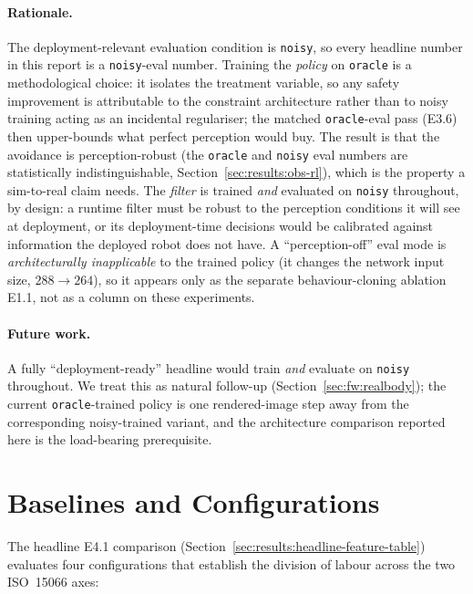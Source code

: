 \documentclass[11pt,a4paper]{report}
\newcommand{\iso}{ISO~15066}
\begin{document}
\paragraph{Rationale.}
The deployment-relevant evaluation condition is \texttt{noisy}, so
every headline number in this report is a \texttt{noisy}-eval number.
Training the \emph{policy} on \texttt{oracle} is a methodological
choice: it isolates the treatment variable, so any safety improvement
is attributable to the constraint architecture rather than to noisy
training acting as an incidental regulariser; the matched
\texttt{oracle}-eval pass (E3.6) then upper-bounds what perfect
perception would buy. The result is that the avoidance is
perception-robust (the \texttt{oracle} and \texttt{noisy} eval numbers
are statistically indistinguishable,
Section~\ref{sec:results:obs-rl}), which is the property a sim-to-real
claim needs. The \emph{filter} is trained \emph{and} evaluated on
\texttt{noisy} throughout, by design: a runtime filter must be robust
to the perception conditions it will see at deployment, or its
deployment-time decisions would be calibrated against information the
deployed robot does not have. A ``perception-off'' eval mode is
\emph{architecturally inapplicable} to the trained policy (it changes
the network input size, $288 \to 264$), so it appears only as the
separate behaviour-cloning ablation E1.1, not as a column on these
experiments.

\paragraph{Future work.}
A fully ``deployment-ready'' headline would train \emph{and}
evaluate on \texttt{noisy} throughout. We treat this as natural
follow-up (Section~\ref{sec:fw:realbody}); the current
\texttt{oracle}-trained policy is one rendered-image step away from
the corresponding noisy-trained variant, and the architecture
comparison reported here is the load-bearing prerequisite.

\section{Baselines and Configurations}
\label{sec:setup:baselines}

The headline E4.1 comparison
(Section~\ref{sec:results:headline-feature-table}) evaluates four
configurations that establish the division of labour across the two
\iso{} axes:
\end{document}
